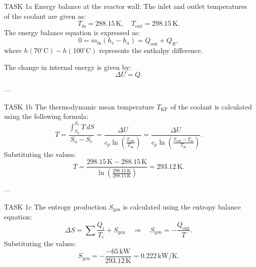 TASK 1a  
Energy balance at the reactor wall:  
The inlet and outlet temperatures of the coolant are given as:  
\[
T_{\text{in}} = 288.15 \, \text{K}, \quad T_{\text{out}} = 298.15 \, \text{K}.
\]  
The energy balance equation is expressed as:  
\[
0 = \dot{m}_{\text{in}} \left( h_e - h_a \right) = Q_{\text{out}} + Q_R,
\]  
where \( h(70^\circ\text{C}) - h(100^\circ\text{C}) \) represents the enthalpy difference.  

The change in internal energy is given by:  
\[
\Delta U = Q.
\]  

---

TASK 1b  
The thermodynamic mean temperature \( T_{\text{KF}} \) of the coolant is calculated using the following formula:  
\[
T = \frac{\int_{S_a}^{S_e} T \, dS}{S_a - S_e} = \frac{\Delta U}{c_p \ln\left(\frac{T_{\text{out}}}{T_{\text{in}}}\right)} = \frac{\Delta U}{c_p \ln\left(\frac{T_{\text{out}} - T_{\text{in}}}{T_{\text{in}}}\right)}.
\]  
Substituting the values:  
\[
T = \frac{298.15 \, \text{K} - 288.15 \, \text{K}}{\ln\left(\frac{298.15 \, \text{K}}{288.15 \, \text{K}}\right)} = 293.12 \, \text{K}.
\]  

---

TASK 1c  
The entropy production \( \dot{S}_{\text{gen}} \) is calculated using the entropy balance equation:  
\[
\Delta S = \sum \frac{Q_i}{T_i} + S_{\text{gen}} \quad \Rightarrow \quad S_{\text{gen}} = -\frac{Q_{\text{out}}}{T}.
\]  
Substituting the values:  
\[
S_{\text{gen}} = -\frac{-65 \, \text{kW}}{293.12 \, \text{K}} = 0.222 \, \text{kW/K}.
\]  